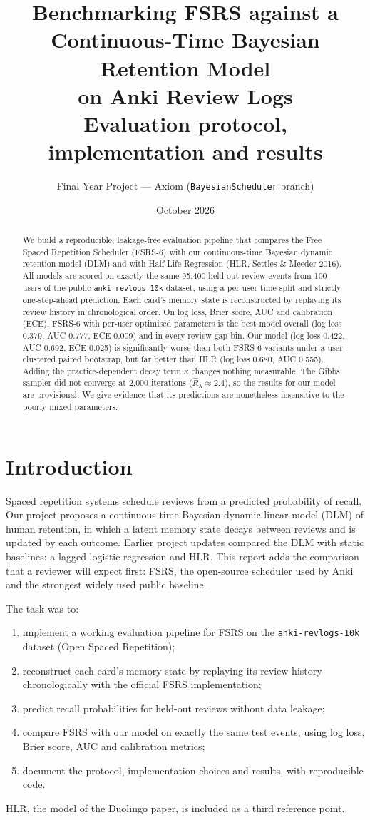 \documentclass[11pt,a4paper]{article}
\title{\textbf{Benchmarking FSRS against a\\Continuous-Time Bayesian Retention Model\\on Anki Review Logs}\\[4pt]
\large Evaluation protocol, implementation and results}
\author{Final Year Project --- Axiom (\texttt{BayesianScheduler} branch)}
\date{October 2026}
\begin{document}
\maketitle

\begin{abstract}
\noindent We build a reproducible, leakage-free evaluation pipeline that compares the Free Spaced Repetition Scheduler (FSRS-6) with our continuous-time Bayesian dynamic retention model (DLM) and with Half-Life Regression (HLR, Settles \& Meeder 2016). All models are scored on exactly the same 95{,}400 held-out review events from 100 users of the public \texttt{anki-revlogs-10k} dataset, using a per-user time split and strictly one-step-ahead prediction. Each card's memory state is reconstructed by replaying its review history in chronological order. On log loss, Brier score, AUC and calibration (ECE), FSRS-6 with per-user optimised parameters is the best model overall (log loss 0.379, AUC 0.777, ECE 0.009) and in every review-gap bin. Our model (log loss 0.422, AUC 0.692, ECE 0.025) is significantly worse than both FSRS-6 variants under a user-clustered paired bootstrap, but far better than HLR (log loss 0.680, AUC 0.555). Adding the practice-dependent decay term $\kappa$ changes nothing measurable. The Gibbs sampler did not converge at 2{,}000 iterations ($\hat R_\lambda \approx 2.4$), so the results for our model are provisional. We give evidence that its predictions are nonetheless insensitive to the poorly mixed parameters.
\end{abstract}

\section{Introduction}
Spaced repetition systems schedule reviews from a predicted probability of recall. Our project proposes a continuous-time Bayesian dynamic linear model (DLM) of human retention, in which a latent memory state decays between reviews and is updated by each outcome. Earlier project updates compared the DLM with static baselines: a lagged logistic regression and HLR. This report adds the comparison that a reviewer will expect first: FSRS, the open-source scheduler used by Anki and the strongest widely used public baseline.

The task was to:
\begin{enumerate}
  \item implement a working evaluation pipeline for FSRS on the \texttt{anki-revlogs-10k} dataset (Open Spaced Repetition);
  \item reconstruct each card's memory state by replaying its review history chronologically with the official FSRS implementation;
  \item predict recall probabilities for held-out reviews without data leakage;
  \item compare FSRS with our model on exactly the same test events, using log loss, Brier score, AUC and calibration metrics;
  \item document the protocol, implementation choices and results, with reproducible code.
\end{enumerate}
HLR, the model of the Duolingo paper, is included as a third reference point.
\end{document}
